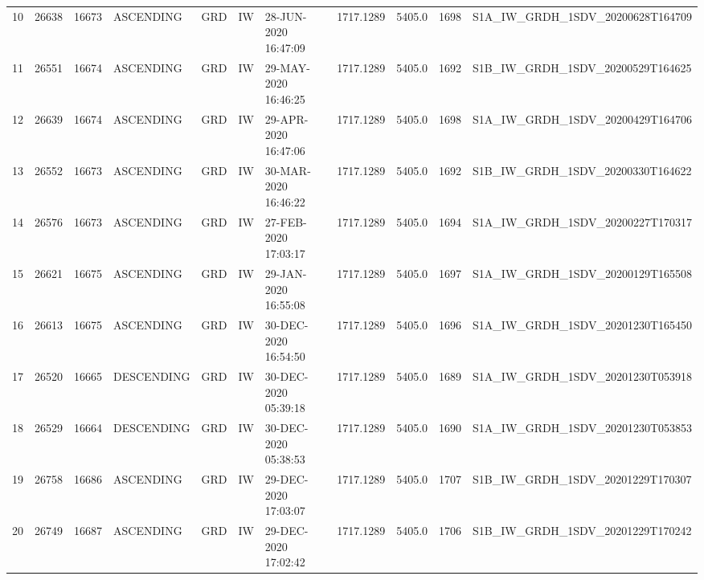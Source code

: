 \begin{tabular}{lrrllllllll}
10  &  26638 &   16673 &   ASCENDING &          GRD &              IW &  28-JUN-2020 16:47:09 &                  1717.1289 &          5405.0 &       1698 &  S1A\_IW\_GRDH\_1SDV\_20200628T164709 \\
11  &  26551 &   16674 &   ASCENDING &          GRD &              IW &  29-MAY-2020 16:46:25 &                  1717.1289 &          5405.0 &       1692 &  S1B\_IW\_GRDH\_1SDV\_20200529T164625 \\
12  &  26639 &   16674 &   ASCENDING &          GRD &              IW &  29-APR-2020 16:47:06 &                  1717.1289 &          5405.0 &       1698 &  S1A\_IW\_GRDH\_1SDV\_20200429T164706 \\
13  &  26552 &   16673 &   ASCENDING &          GRD &              IW &  30-MAR-2020 16:46:22 &                  1717.1289 &          5405.0 &       1692 &  S1B\_IW\_GRDH\_1SDV\_20200330T164622 \\
14  &  26576 &   16673 &   ASCENDING &          GRD &              IW &  27-FEB-2020 17:03:17 &                  1717.1289 &          5405.0 &       1694 &  S1A\_IW\_GRDH\_1SDV\_20200227T170317 \\
15  &  26621 &   16675 &   ASCENDING &          GRD &              IW &  29-JAN-2020 16:55:08 &                  1717.1289 &          5405.0 &       1697 &  S1A\_IW\_GRDH\_1SDV\_20200129T165508 \\
16  &  26613 &   16675 &   ASCENDING &          GRD &              IW &  30-DEC-2020 16:54:50 &                  1717.1289 &          5405.0 &       1696 &  S1A\_IW\_GRDH\_1SDV\_20201230T165450 \\
17  &  26520 &   16665 &  DESCENDING &          GRD &              IW &  30-DEC-2020 05:39:18 &                  1717.1289 &          5405.0 &       1689 &  S1A\_IW\_GRDH\_1SDV\_20201230T053918 \\
18  &  26529 &   16664 &  DESCENDING &          GRD &              IW &  30-DEC-2020 05:38:53 &                  1717.1289 &          5405.0 &       1690 &  S1A\_IW\_GRDH\_1SDV\_20201230T053853 \\
19  &  26758 &   16686 &   ASCENDING &          GRD &              IW &  29-DEC-2020 17:03:07 &                  1717.1289 &          5405.0 &       1707 &  S1B\_IW\_GRDH\_1SDV\_20201229T170307 \\
20  &  26749 &   16687 &   ASCENDING &          GRD &              IW &  29-DEC-2020 17:02:42 &                  1717.1289 &          5405.0 &       1706 &  S1B\_IW\_GRDH\_1SDV\_20201229T170242 \\

\end{tabular}
